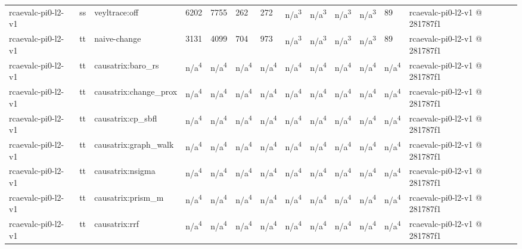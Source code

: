 \begin{table}[t]
\begin{tabular}{lllllllllllll}
rcaevalc-pi0-l2-v1 & ss & veyltrace:off & 6202 & 7755 & 262 & 272 & n/a\textsuperscript{3} & n/a\textsuperscript{3} & n/a\textsuperscript{3} & n/a\textsuperscript{3} & 89 & rcaevalc-pi0-l2-v1 @ 281787f1 \\
rcaevalc-pi0-l2-v1 & tt & naive-change & 3131 & 4099 & 704 & 973 & n/a\textsuperscript{3} & n/a\textsuperscript{3} & n/a\textsuperscript{3} & n/a\textsuperscript{3} & 89 & rcaevalc-pi0-l2-v1 @ 281787f1 \\
rcaevalc-pi0-l2-v1 & tt & causatrix:baro\_rs & n/a\textsuperscript{4} & n/a\textsuperscript{4} & n/a\textsuperscript{4} & n/a\textsuperscript{4} & n/a\textsuperscript{4} & n/a\textsuperscript{4} & n/a\textsuperscript{4} & n/a\textsuperscript{4} & n/a\textsuperscript{4} & rcaevalc-pi0-l2-v1 @ 281787f1 \\
rcaevalc-pi0-l2-v1 & tt & causatrix:change\_prox & n/a\textsuperscript{4} & n/a\textsuperscript{4} & n/a\textsuperscript{4} & n/a\textsuperscript{4} & n/a\textsuperscript{4} & n/a\textsuperscript{4} & n/a\textsuperscript{4} & n/a\textsuperscript{4} & n/a\textsuperscript{4} & rcaevalc-pi0-l2-v1 @ 281787f1 \\
rcaevalc-pi0-l2-v1 & tt & causatrix:cp\_sbfl & n/a\textsuperscript{4} & n/a\textsuperscript{4} & n/a\textsuperscript{4} & n/a\textsuperscript{4} & n/a\textsuperscript{4} & n/a\textsuperscript{4} & n/a\textsuperscript{4} & n/a\textsuperscript{4} & n/a\textsuperscript{4} & rcaevalc-pi0-l2-v1 @ 281787f1 \\
rcaevalc-pi0-l2-v1 & tt & causatrix:graph\_walk & n/a\textsuperscript{4} & n/a\textsuperscript{4} & n/a\textsuperscript{4} & n/a\textsuperscript{4} & n/a\textsuperscript{4} & n/a\textsuperscript{4} & n/a\textsuperscript{4} & n/a\textsuperscript{4} & n/a\textsuperscript{4} & rcaevalc-pi0-l2-v1 @ 281787f1 \\
rcaevalc-pi0-l2-v1 & tt & causatrix:nsigma & n/a\textsuperscript{4} & n/a\textsuperscript{4} & n/a\textsuperscript{4} & n/a\textsuperscript{4} & n/a\textsuperscript{4} & n/a\textsuperscript{4} & n/a\textsuperscript{4} & n/a\textsuperscript{4} & n/a\textsuperscript{4} & rcaevalc-pi0-l2-v1 @ 281787f1 \\
rcaevalc-pi0-l2-v1 & tt & causatrix:prism\_m & n/a\textsuperscript{4} & n/a\textsuperscript{4} & n/a\textsuperscript{4} & n/a\textsuperscript{4} & n/a\textsuperscript{4} & n/a\textsuperscript{4} & n/a\textsuperscript{4} & n/a\textsuperscript{4} & n/a\textsuperscript{4} & rcaevalc-pi0-l2-v1 @ 281787f1 \\
rcaevalc-pi0-l2-v1 & tt & causatrix:rrf & n/a\textsuperscript{4} & n/a\textsuperscript{4} & n/a\textsuperscript{4} & n/a\textsuperscript{4} & n/a\textsuperscript{4} & n/a\textsuperscript{4} & n/a\textsuperscript{4} & n/a\textsuperscript{4} & n/a\textsuperscript{4} & rcaevalc-pi0-l2-v1 @ 281787f1 \\

\end{tabular}
\end{table}

